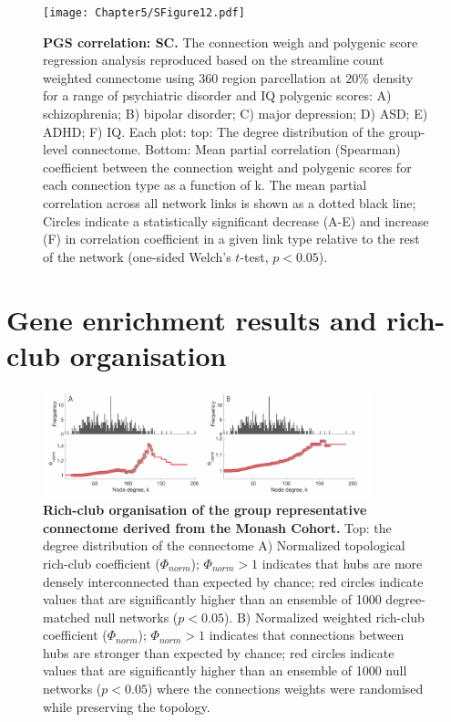 \begin{figure}[h!]
\begin{center}
\texttt{[image: Chapter5/SFigure12.pdf]}%
\end{center}
\caption{\textbf{PGS correlation: SC.} 
The connection weigh and polygenic score regression analysis reproduced based on the streamline count weighted connectome using 360 region parcellation at $20\%$ density for a range of psychiatric disorder and IQ polygenic scores: A) schizophrenia; B) bipolar disorder; C) major depression; D) ASD; E) ADHD; F) IQ. Each plot: top: The degree distribution of the group-level connectome. Bottom: Mean partial correlation (Spearman) coefficient between the connection weight and polygenic scores for each connection type as a function of k. The mean partial correlation across all network links is shown as a dotted black line; Circles indicate a statistically significant decrease (A-E) and increase (F) in correlation coefficient in a given link type relative to the rest of the network (one-sided Welch's $t$-test, $p < 0.05$). }
\label{fig:Ch5SFig12}
\end{figure}

\clearpage
\section{Gene enrichment results and rich-club organisation}
\label{app:AppendixCh5_3}

\begin{figure}[h!]
\begin{center}
\includegraphics[width=0.85\textwidth]{Chapter5/SFigure13.pdf}%
\end{center}
\caption{\textbf{Rich-club organisation of the group representative connectome derived from the Monash Cohort.} Top: the degree distribution of the connectome A) Normalized topological rich-club coefficient ($\Phi_{norm}$); $\Phi_{norm}>1$ indicates that hubs are more densely interconnected than expected by chance; red circles indicate values that are significantly higher than an ensemble of 1000 degree-matched null networks ($p<0.05$). B) Normalized weighted rich-club coefficient ($\Phi_{norm}$); $\Phi_{norm}>1$ indicates that connections between hubs are stronger than expected by chance; red circles indicate values that are significantly higher than an ensemble of 1000 null networks ($p<0.05$) where the connections weights were randomised while preserving the topology. }
\label{fig:Ch5SFig13}
\end{figure}

